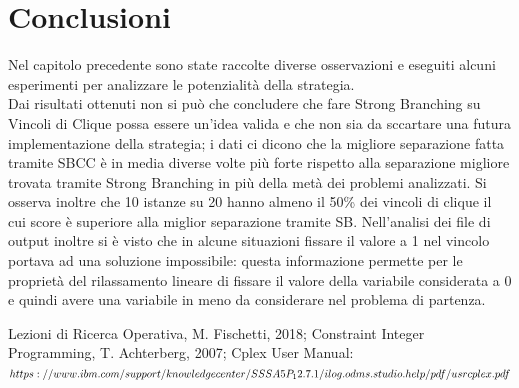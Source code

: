\documentclass[12pt,a4paper,twoside,openright]{book}
\begin{document}
\chapter{Conclusioni}
Nel capitolo precedente sono state raccolte diverse osservazioni e eseguiti alcuni esperimenti per 
analizzare le potenzialità della strategia. \\Dai risultati ottenuti non si può che concludere che
fare Strong Branching su Vincoli di Clique possa essere un'idea valida e che non sia da sccartare una 
futura implementazione della strategia; i dati ci dicono che la migliore separazione fatta tramite SBCC è in media
diverse volte più forte rispetto alla separazione migliore trovata tramite Strong Branching in più della 
metà dei problemi analizzati. Si osserva inoltre che 10 istanze su 20 hanno almeno il 50\% dei vincoli di clique il cui score
è superiore alla miglior separazione tramite SB. Nell'analisi dei file di output inoltre si è visto che in 
alcune situazioni fissare il valore a 1 nel vincolo portava ad una soluzione impossibile: questa informazione permette 
per le proprietà del rilassamento lineare di fissare il valore della variabile considerata a 0 e quindi
avere una variabile in meno da considerare nel problema di partenza.


\renewcommand{\bibname}{Bibliografia/Sitografia}
\begin{thebibliography}{100}
    \bibitem{} Lezioni di Ricerca Operativa, M. Fischetti, 2018;
    \bibitem{} Constraint Integer Programming, T. Achterberg, 2007;
    \bibitem{} Cplex User Manual: \\ 
    $https://www.ibm.com/support/knowledgecenter/SSSA5P_12.7.1/
    \\ilog.odms.studio.help/pdf/usrcplex.pdf$
\end{thebibliography}
\end{document}
